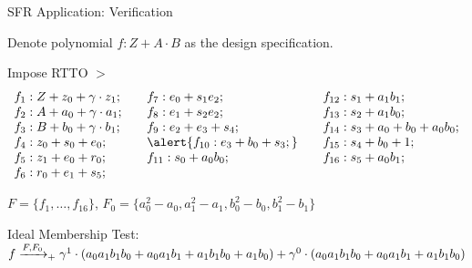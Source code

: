 \begin{frame}{\large SFR Application: Verification}
\bi
	\item Denote polynomial $f: Z + A\cdot B$ as the design specification.
	\item Impose RTTO $>$
\ei
\[ \begin{array}{lll}%
f_1:Z + z_0 +\ga \cdot z_1;&\quad  f_7:e_0 + s_1e_2; 	   &\quad f_{12}:s_1 + a_1b_1; \\
f_2:A + a_0 +\ga \cdot a_1;&\quad  f_8:e_1 + s_2e_2; 	   &\quad f_{13}:s_2 + a_1b_0;  \\
f_3:B + b_0 +\ga \cdot b_1;&\quad  f_9:e_2 + e_3 + s_4;    &\quad f_{14}:s_3 + a_0 + b_0 + a_0b_0; \\ 
f_4:z_0 + s_0 + e_0;  	   &\quad  \alert{f_{10}:e_3 + b_0 + s_3;} &\quad f_{15}:s_4 + b_0 + 1;\\ 
f_5:z_1 + e_0 + r_0;  	   &\quad  f_{11}:s_0 + a_0b_0;    &\quad f_{16}:s_5 + a_0b_1;  \\
f_6:r_0 + e_1 + s_5;            						    
\end{array}\]%

\bi
	\item $F = \{f_1,\dots,f_{16}\}$, $F_0 = \{a_0^2-a_0, a_1^2-a_1,
b_0^2-b_0, b_1^2-b_1\}$
	\item Ideal Membership Test: $f\xrightarrow{F,F_0}_+\gamma^1\cdot (a_0a_1b_1b_0+a_0a_1b_1+a_1b_1b_0+a_1b_0) + \gamma^0\cdot (a_0a_1b_1b_0+a_0a_1b_1+a_1b_1b_0)$
\ei
\end{frame}



